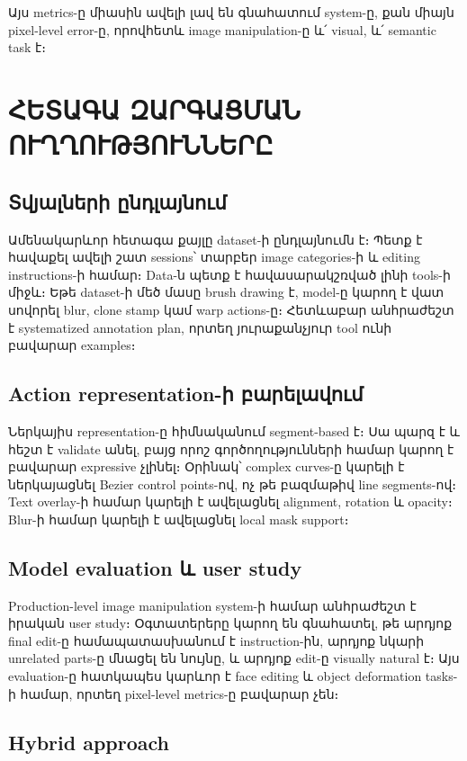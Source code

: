 \documentclass[12pt,a4paper]{report}
\begin{document}
Այս metrics-ը միասին ավելի լավ են գնահատում system-ը, քան միայն pixel-level error-ը, որովհետև image manipulation-ը և՛ visual, և՛ semantic task է։

\chapter{ՀԵՏԱԳԱ ԶԱՐԳԱՑՄԱՆ ՈՒՂՂՈՒԹՅՈՒՆՆԵՐԸ}

\section{Տվյալների ընդլայնում}

Ամենակարևոր հետագա քայլը dataset-ի ընդլայնումն է։ Պետք է հավաքել ավելի շատ sessions՝ տարբեր image categories-ի և editing instructions-ի համար։ Data-ն պետք է հավասարակշռված լինի tools-ի միջև։ Եթե dataset-ի մեծ մասը brush drawing է, model-ը կարող է վատ սովորել blur, clone stamp կամ warp actions-ը։ Հետևաբար անհրաժեշտ է systematized annotation plan, որտեղ յուրաքանչյուր tool ունի բավարար examples։

\section{Action representation-ի բարելավում}

Ներկայիս representation-ը հիմնականում segment-based է։ Սա պարզ է և հեշտ է validate անել, բայց որոշ գործողությունների համար կարող է բավարար expressive չլինել։ Օրինակ՝ complex curves-ը կարելի է ներկայացնել Bezier control points-ով, ոչ թե բազմաթիվ line segments-ով։ Text overlay-ի համար կարելի է ավելացնել alignment, rotation և opacity։ Blur-ի համար կարելի է ավելացնել local mask support։

\section{Model evaluation և user study}

Production-level image manipulation system-ի համար անհրաժեշտ է իրական user study։ Օգտատերերը կարող են գնահատել, թե արդյոք final edit-ը համապատասխանում է instruction-ին, արդյոք նկարի unrelated parts-ը մնացել են նույնը, և արդյոք edit-ը visually natural է։ Այս evaluation-ը հատկապես կարևոր է face editing և object deformation tasks-ի համար, որտեղ pixel-level metrics-ը բավարար չեն։

\section{Hybrid approach}
\end{document}
